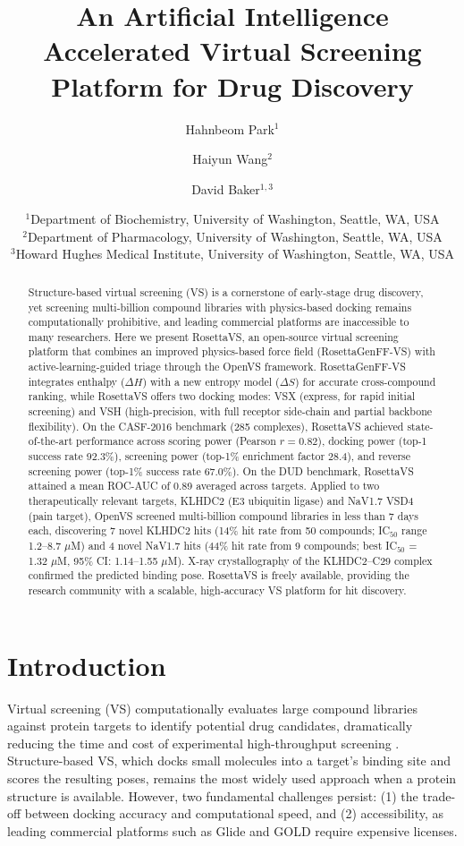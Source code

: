 \documentclass[11pt]{article}
\title{An Artificial Intelligence Accelerated Virtual Screening Platform for Drug Discovery}
\author{
  Hahnbeom Park$^{1}$ \and
  Haiyun Wang$^{2}$ \and
  David Baker$^{1,3}$
}
\date{
  $^{1}$Department of Biochemistry, University of Washington, Seattle, WA, USA \\
  $^{2}$Department of Pharmacology, University of Washington, Seattle, WA, USA \\
  $^{3}$Howard Hughes Medical Institute, University of Washington, Seattle, WA, USA
}
\begin{document}
\maketitle

\begin{abstract}
Structure-based virtual screening (VS) is a cornerstone of early-stage drug discovery, yet screening multi-billion compound libraries with physics-based docking remains computationally prohibitive, and leading commercial platforms are inaccessible to many researchers. Here we present RosettaVS, an open-source virtual screening platform that combines an improved physics-based force field (RosettaGenFF-VS) with active-learning-guided triage through the OpenVS framework. RosettaGenFF-VS integrates enthalpy ($\Delta H$) with a new entropy model ($\Delta S$) for accurate cross-compound ranking, while RosettaVS offers two docking modes: VSX (express, for rapid initial screening) and VSH (high-precision, with full receptor side-chain and partial backbone flexibility). On the CASF-2016 benchmark (285 complexes), RosettaVS achieved state-of-the-art performance across scoring power (Pearson $r = 0.82$), docking power (top-1 success rate 92.3\%), screening power (top-1\% enrichment factor 28.4), and reverse screening power (top-1\% success rate 67.0\%). On the DUD benchmark, RosettaVS attained a mean ROC-AUC of 0.89 averaged across targets. Applied to two therapeutically relevant targets, KLHDC2 (E3 ubiquitin ligase) and NaV1.7 VSD4 (pain target), OpenVS screened multi-billion compound libraries in less than 7 days each, discovering 7 novel KLHDC2 hits (14\% hit rate from 50 compounds; IC$_{50}$ range 1.2--8.7 $\mu$M) and 4 novel NaV1.7 hits (44\% hit rate from 9 compounds; best IC$_{50}$ = 1.32 $\mu$M, 95\% CI: 1.14--1.55 $\mu$M). X-ray crystallography of the KLHDC2--C29 complex confirmed the predicted binding pose. RosettaVS is freely available, providing the research community with a scalable, high-accuracy VS platform for hit discovery.
\end{abstract}

\section{Introduction}

Virtual screening (VS) computationally evaluates large compound libraries against protein targets to identify potential drug candidates, dramatically reducing the time and cost of experimental high-throughput screening \citep{shoichet2004, kitchen2004}. Structure-based VS, which docks small molecules into a target's binding site and scores the resulting poses, remains the most widely used approach when a protein structure is available. However, two fundamental challenges persist: (1) the trade-off between docking accuracy and computational speed, and (2) accessibility, as leading commercial platforms such as Glide \citep{friesner2004} and GOLD \citep{jones1997} require expensive licenses.
\end{document}
